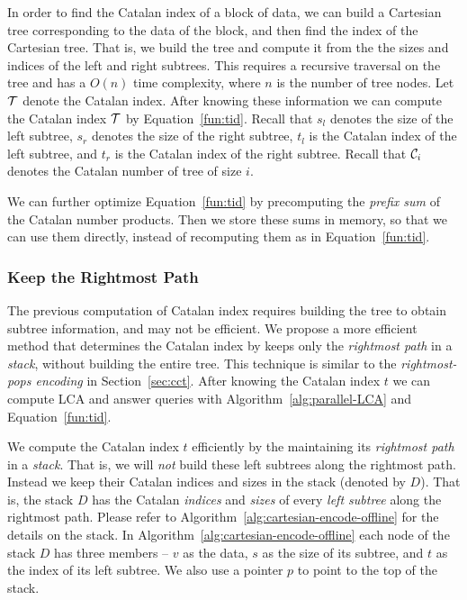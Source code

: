 In order to find the Catalan index of a block of data, we can build a
Cartesian tree corresponding to the data of the block, and then find
the index of the Cartesian tree.  That is, we build the tree and
compute it from the the sizes and indices of the left and right
subtrees.  This requires a recursive traversal on the tree and has a
$O(n)$ time complexity, where $n$ is the number of tree nodes.  Let
$\cal T$ denote the Catalan index.  After knowing these information we
can compute the Catalan index $\cal T$ by Equation~\ref{fun:tid}.
Recall that $s_l$ denotes the size of the left subtree, $s_r$ denotes
the size of the right subtree, $t_l$ is the Catalan index of the left
subtree, and $t_r$ is the Catalan index of the right subtree.  Recall
that ${\cal C}_i$ denotes the Catalan number of tree of size $i$.

% 



We can further optimize Equation~\ref{fun:tid} by precomputing the
{\em prefix sum} of the Catalan number products.  Then we store these
sums in memory, so that we can use them directly, instead of
recomputing them as in Equation~\ref{fun:tid}.  


\subsubsection{Keep the Rightmost Path}

The previous computation of Catalan index requires building the tree
to obtain subtree information, and may not be efficient.  We propose a
more efficient method that determines the Catalan index by keeps only
the {\em rightmost path} in a {\em stack}, without building the entire
tree.  This technique is similar to the {\em rightmost-pops encoding}
in Section~\ref{sec:cct}.  After knowing the Catalan index $t$ we can
compute LCA and answer queries with Algorithm~\ref{alg:parallel-LCA}
and Equation~\ref{fun:tid}.

We compute the Catalan index $t$ efficiently by the maintaining its
{\em rightmost path} in a {\em stack}.  That is, we will {\em not}
build these left subtrees along the rightmost path.  Instead we keep
their Catalan indices and sizes in the stack (denoted by $D$).  That
is, the stack $D$ has the Catalan {\em indices} and {\em sizes} of
every {\em left subtree} along the rightmost path.  Please refer to
Algorithm~\ref{alg:cartesian-encode-offline} for the details on the
stack.  In Algorithm~\ref{alg:cartesian-encode-offline} each node of
the stack $D$ has three members -- $v$ as the data, $s$ as the size of
its subtree, and $t$ as the index of its left subtree.  We also use a
pointer $p$ to point to the top of the stack.

